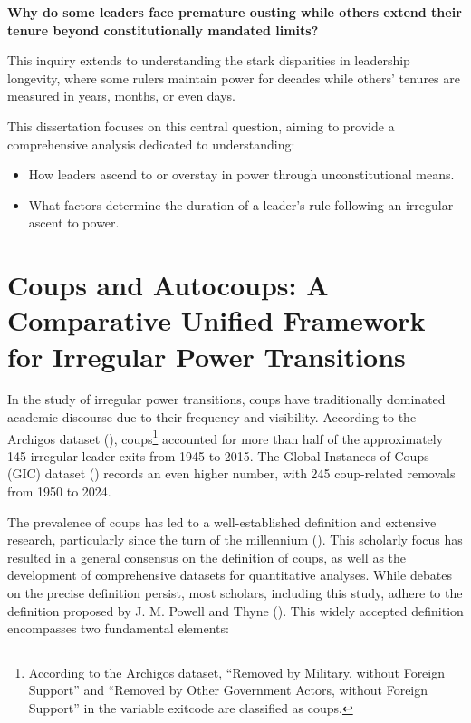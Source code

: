 \documentclass[
  12pt,
]{report}
\begin{document}
\textbf{Why do some leaders face premature ousting while others extend
their tenure beyond constitutionally mandated limits?}

This inquiry extends to understanding the stark disparities in
leadership longevity, where some rulers maintain power for decades while
others' tenures are measured in years, months, or even days.

This dissertation focuses on this central question, aiming to provide a
comprehensive analysis dedicated to understanding:

\begin{itemize}
\item
  How leaders ascend to or overstay in power through unconstitutional
  means.
\item
  What factors determine the duration of a leader's rule following an
  irregular ascent to power.
\end{itemize}

\section{Coups and Autocoups: A Comparative Unified Framework for
Irregular Power
Transitions}\label{coups-and-autocoups-a-comparative-unified-framework-for-irregular-power-transitions}

In the study of irregular power transitions, coups have traditionally
dominated academic discourse due to their frequency and visibility.
According to the Archigos dataset (), coups\footnote{According to the Archigos
  dataset, ``Removed by Military, without Foreign Support'' and
  ``Removed by Other Government Actors, without Foreign Support'' in the
  variable exitcode are classified as coups.} accounted for more than
half of the approximately 145 irregular leader exits from 1945 to 2015.
The Global Instances of Coups (GIC) dataset
() records an even
higher number, with 245 coup-related removals from 1950 to 2024.

The prevalence of coups has led to a well-established definition and
extensive research, particularly since the turn of the millennium
(). This scholarly
focus has resulted in a general consensus on the definition of coups, as
well as the development of comprehensive datasets for quantitative
analyses. While debates on the precise definition persist, most
scholars, including this study, adhere to the definition proposed by J.
M. Powell and Thyne (). This widely
accepted definition encompasses two fundamental elements:
\end{document}
